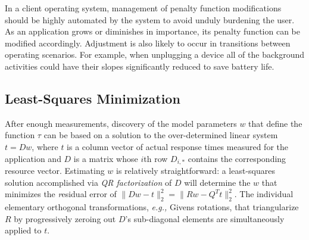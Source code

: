 In a client operating system, management of penalty function modifications
should be highly automated by the system to avoid unduly burdening the user.
As an application grows or diminishes in importance, its penalty function can be modified accordingly.
Adjustment is also likely to occur in transitions between operating scenarios.
For example, when unplugging a device all of the background activities could have their slopes significantly reduced to save battery life.

\subsection*{Least-Squares Minimization}
After enough measurements, discovery of the model parameters $w$ that define the function $\tau$
can be based on a solution to the over-determined linear system $t=Dw$,
where $t$ is a column vector of actual response times measured for the application
and $D$ is a matrix whose $i$th row $D_{i,*}$ contains the corresponding resource vector.
Estimating $w$ is relatively straightforward: a least-squares solution accomplished via
\emph{QR factorization}\cite{GoVL} of $D$ will determine the $w$ that minimizes the \emph residual error of
$\|Dw - t\|^2_2 =  \|Rw - Q^Tt\|^2_2$.
%
The individual elementary orthogonal transformations, \emph{e.g.,} Givens rotations,
that triangularize $R$ by progressively zeroing out $D$'s sub-diagonal elements are simultaneously applied to $t$.


